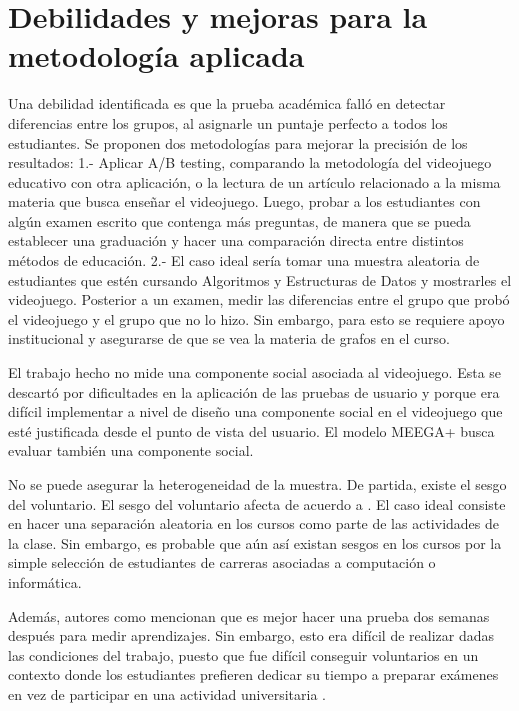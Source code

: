 \section{Debilidades y mejoras para la metodología aplicada}

Una debilidad identificada es que la prueba académica falló en detectar diferencias entre los grupos, al asignarle un puntaje perfecto a todos los estudiantes. Se proponen dos metodologías para mejorar la precisión de los resultados: 1.- Aplicar A/B testing, comparando la metodología del videojuego educativo con otra aplicación, o la lectura de un artículo relacionado a la misma materia que busca enseñar el videojuego. Luego, probar a los estudiantes con algún examen escrito que contenga más preguntas, de manera que se pueda establecer una graduación y hacer una comparación directa entre distintos métodos de educación. 2.- El caso ideal sería tomar una muestra aleatoria de estudiantes que estén cursando Algoritmos y Estructuras de Datos y mostrarles el videojuego. Posterior a un examen, medir las diferencias entre el grupo que probó el videojuego y el grupo que no lo hizo. Sin embargo, para esto se requiere apoyo institucional y asegurarse de que se vea la materia de grafos en el curso. 

El trabajo hecho no mide una componente social asociada al videojuego. Esta se descartó por dificultades en la aplicación de las pruebas de usuario y porque era difícil implementar a nivel de diseño una componente social en el videojuego que esté justificada desde el punto de vista del usuario. El modelo MEEGA+ \cite{meegaplus} busca evaluar también una componente social.

No se puede asegurar la heterogeneidad de la muestra. De partida, existe el sesgo del voluntario. El sesgo del voluntario afecta de acuerdo a \cite{volunterBias}. El caso ideal consiste en hacer una separación aleatoria en los cursos como parte de las actividades de la clase. Sin embargo, es probable que aún así existan sesgos en los cursos por la simple selección de estudiantes de carreras asociadas a computación o informática. %

Además, autores como mencionan que es mejor hacer una prueba dos semanas después para medir aprendizajes. Sin embargo, esto era difícil de realizar dadas las condiciones del trabajo, puesto que fue difícil conseguir voluntarios en un contexto donde los estudiantes prefieren dedicar su tiempo a preparar exámenes en vez de participar en una actividad universitaria \cite{Rogers2002InteractionDB}.

